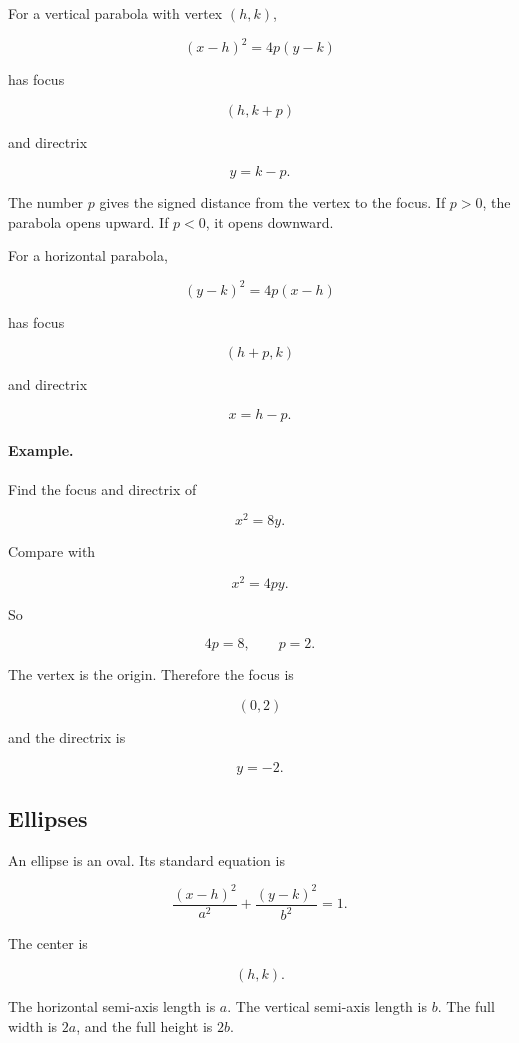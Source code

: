 For a vertical parabola with vertex \((h,k)\),

\[
\boxed{
(x-h)^2=4p(y-k)
}
\]

has focus

\[
(h,k+p)
\]

and directrix

\[
y=k-p.
\]

The number \(p\) gives the signed distance from the vertex to the focus.  If
\(p>0\), the parabola opens upward.  If \(p<0\), it opens downward.

For a horizontal parabola,

\[
\boxed{
(y-k)^2=4p(x-h)
}
\]

has focus

\[
(h+p,k)
\]

and directrix

\[
x=h-p.
\]

\paragraph{Example.}
Find the focus and directrix of

\[
x^2=8y.
\]

Compare with

\[
x^2=4py.
\]

So

\[
4p=8,
\qquad
p=2.
\]

The vertex is the origin.  Therefore the focus is

\[
\boxed{(0,2)}
\]

and the directrix is

\[
\boxed{y=-2}.
\]

\subsection{Ellipses}
\label{appsubsec:ellipses}

An ellipse is an oval.  Its standard equation is

\[
\boxed{
\frac{(x-h)^2}{a^2}+\frac{(y-k)^2}{b^2}=1.
}
\]

The center is

\[
(h,k).
\]

The horizontal semi-axis length is \(a\).  The vertical semi-axis length is \(b\).
The full width is \(2a\), and the full height is \(2b\).

